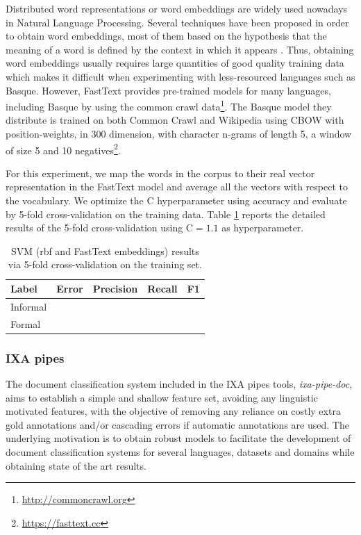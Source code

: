 \documentclass[information,article,submit,moreauthors,pdftex,10pt,a4paper]{Definitions/mdpi}
\begin{document}
Distributed word representations or word embeddings are widely used nowadays in Natural Language Processing. Several techniques have been proposed in order to obtain word embeddings, most of them based on the hypothesis that the meaning of a word is defined by the context in which it appears \cite{mikolov2013distributed,pennington-etal-2014-glove}. Thus, obtaining word embeddings usually requires large quantities of good quality training data which makes it difficult when experimenting with less-resourced languages such as Basque. However, FastText provides pre-trained models for many languages, including Basque \cite{mikolov-etal-2018-advances} by using the common crawl data\footnote{\url{http://commoncrawl.org}}. The Basque model they distribute is trained on both Common Crawl and Wikipedia using CBOW with position-weights, in 300 dimension, with character n-grams of length 5, a window of size 5 and 10 negatives\footnote{\url{https://fasttext.cc}}.

For this experiment, we map the words in the corpus to their real vector representation in the FastText model and average all the vectors with respect to the vocabulary. We optimize the C hyperparameter using accuracy and evaluate by 5-fold cross-validation on the training data. Table \ref{tab:svmf1} reports the detailed results of the 5-fold cross-validation using C$=1.1$ as hyperparameter.

\begin{table}[H]
  \centering
  \begin{tabular}{lcccc}
    \hline
    Label & Error & Precision & Recall & F1 \\ \hline \hline
    Informal & &  &   &  \\
    Formal &  &  &  &  \\ \hline
  \end{tabular}
  \caption{SVM (rbf and FastText embeddings) results via 5-fold cross-validation on the training set.}
  \label{tab:svmf1}
\end{table}

\subsubsection{IXA pipes}\label{sec:ixa}

The document classification system included in the IXA pipes tools, \emph{ixa-pipe-doc}, aims to establish a simple and shallow feature set, avoiding any linguistic motivated features, with the objective of removing any reliance on costly extra gold annotations and/or cascading errors if automatic annotations are used. The underlying motivation is to obtain robust models to facilitate the development of document classification systems for several languages, datasets and domains while obtaining state of the art results.
\end{document}
